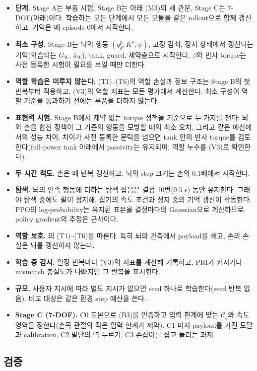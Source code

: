 \documentclass[11pt]{article}\usepackage[margin=1in]{geometry}\usepackage{amsmath,amssymb,amsthm,mathtools}\usepackage{graphicx}\graphicspath{{figures/}{../figures/}{figs/}{./}}\usepackage{enumitem}\usepackage{hyperref}\usepackage{cleveref}\usepackage{tikz}\usetikzlibrary{arrows.meta,positioning,calc,shapes.geometric}\usepackage{float}\usepackage{rotating}\usepackage[most]{tcolorbox}\usepackage{kotex}\usepackage{booktabs}\usepackage{longtable}\emergencystretch=1.6em\tolerance=2000 \crefname{assumption}{Assumption}{Assumptions}\Crefname{assumption}{Assumption}{Assumptions}\crefname{definition}{Definition}{Definitions}\Crefname{definition}{Definition}{Definitions}\crefname{proposition}{Proposition}{Propositions}\Crefname{proposition}{Proposition}{Propositions}\crefname{fact}{Fact}{Facts}\Crefname{fact}{Fact}{Facts} \newtheorem{assumption}{Assumption}\newtheorem{definition}{Definition}\newtheorem{lemma}{Lemma}\newtheorem{proposition}{Proposition}\newtheorem{theorem}{Theorem}\newtheorem{corollary}{Corollary}\newtheorem{fact}{Fact}\theoremstyle{remark}\newtheorem{remark}{Remark} \newcommand{\R}{\mathbb{R}}\newcommand{\xb}{\bar x}\newcommand{\Ab}{\bar A}\newcommand{\By}{\bar B_y}\newcommand{\U}{\mathcal U}\newcommand{\Z}{\mathcal Z}
\begin{document}
\begin{itemize}
\item \textbf{단계.} Stage A는 부품 시험, Stage B는 아래 (M3)의 세 관문, Stage C는 7-DOF(아래)이다. 학습하는 모든 단계에서 모든 모듈을 같은 rollout으로 함께 갱신하고, 기억은 매 episode 0에서 시작한다.
\item \textbf{최소 구성.} Stage B는 뇌의 행동 $(q_d^p,K^p,\psi)$, 고정 감쇠, 정지 상태에서 갱신되는 기억(학습되는 $G_W$, $\bar a_W$), tank, guard, 제약층으로 시작한다. $\beta$와 반사 torque는 사전 등록한 시험이 필요를 보일 때만 더한다.
\item \textbf{역할 학습은 미루지 않는다.} (T1)--(T6)의 역할 손실과 정보 구조는 Stage B의 첫 반복부터 적용하고, (V3)의 역할 지표는 모든 평가에서 계산한다. 최소 구성이 역할 기준을 통과하기 전에는 부품을 더하지 않는다.
\item \textbf{표현력 시험.} Stage B에서 제약 없는 torque 정책을 기준으로 두 가지를 잰다: 뇌와 손을 합친 정책이 그 기준의 행동을 모방할 때의 최소 오차, 그리고 같은 예산에서의 성능 차이. 차이가 사전 등록한 문턱을 넘으면 tank 안의 반사 torque를 검토한다(full-power tank 아래에서 passivity는 유지되며, 역할 누수를 (V3)로 확인한다).
\item \textbf{두 시간 척도.} 손은 매 반복 갱신하고, 뇌의 step 크기는 손의 0.1배에서 시작한다.
\item \textbf{탐색.} 뇌의 연속 행동에 더하는 탐색 잡음은 결정 10번(0.5 s) 동안 유지한다. 그래야 탐색 중에도 팔이 정지해, 잡기의 속도 조건과 정지 중의 기억 갱신이 작동한다. PPO의 log-probability는 유지된 표본을 결정마다의 Gaussian으로 계산하므로, policy gradient의 추정은 근사이다.
\item \textbf{역할 보호.} 의 (T1)--(T6)를 따른다. 특히 뇌의 관측에서 payload를 빼고, 손의 손실은 뇌를 갱신하지 않는다.
\item \textbf{학습 중 감시.} 일정 반복마다 (V3)의 지표를 계산해 기록하고, PRI가 커지거나 mismatch 충실도가 나빠지면 그 반복을 표시한다.
\item \textbf{규모.} 사용자 지시에 따라 별도 지시가 없으면 seed 하나로 학습한다(seed 반복 없음). 비교 대상은 같은 환경 step 예산을 쓴다.
\item \textbf{Stage C (7-DOF).} C0 표본으로 (B3)를 인증하고 입력 한계에 맞는 $\mathcal C_q$와 속도 영역을 정한다(손목 관절의 작은 입력 한계가 제약). C1 미지 payload를 가진 도달과 calibration, C2 말단의 벽 누르기, C3 손잡이를 잡고 돌리는 과제.
\end{itemize}

\subsection{검증}
\end{document}
